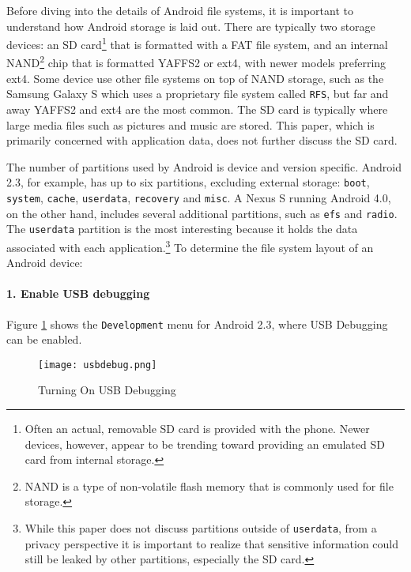 Before diving into the details of Android file systems, it is important to understand how Android storage is laid out.  There are
typically two storage devices: an SD card\footnote{Often an actual, removable SD card is provided with the phone. Newer devices,
however, appear to be trending toward providing an emulated SD card from internal storage.} that is formatted with a FAT file
system, and an internal NAND\footnote{NAND is a type of non-volatile flash memory that is commonly used for file storage.} chip that
is formatted YAFFS2 or ext4, with newer models preferring ext4. Some device use other file systems on top
of NAND storage, such as the Samsung Galaxy S which uses a proprietary file system called \texttt{RFS}, but far and away
YAFFS2 and ext4 are the most common. The SD card is typically where large media files such as pictures and music
are stored. This paper, which is primarily concerned with application data, does not further discuss the SD card.

The number of partitions used by Android is device and version specific.  Android 2.3, for example, has up to six partitions,
excluding external storage: \texttt{boot}, \texttt{system}, \texttt{cache}, \texttt{userdata}, \texttt{recovery} and \texttt{misc}.
A Nexus S running Android 4.0, on the other hand, includes several additional partitions, such as \texttt{efs} and \texttt{radio}.
The \texttt{userdata} partition is the most interesting because it holds the data associated with each application.\footnote{
While this paper does not discuss partitions outside of \texttt{userdata}, from a privacy perspective it is important to realize
that sensitive information could still be leaked by other partitions, especially the SD card.} To determine the file system layout
of an Android device:

\paragraph {1. Enable USB debugging} 
Figure \ref{fig:usbdebug} shows the \texttt{Development} menu for Android 2.3, where USB Debugging can be
enabled.  
\begin{figure}[htb]
\begin{center}\texttt{[image: usbdebug.png]}\end{center}
\caption{Turning On USB Debugging}
\label{fig:usbdebug}
\end{figure}

